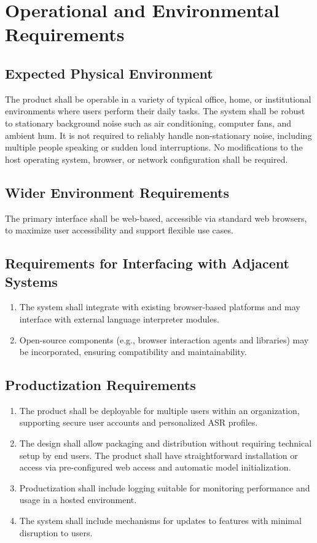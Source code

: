 \documentclass[12pt]{article}
\begin{document}
\section{Operational and Environmental Requirements}
\subsection{Expected Physical Environment}
The product shall be operable in a variety of typical office, home, or institutional environments where users perform their daily tasks. The system shall be robust to stationary background noise such as air conditioning, computer fans, and ambient hum. It is not required to reliably handle non-stationary noise, including multiple people speaking or sudden loud interruptions. No modifications to the host operating system, browser, or network configuration shall be required.
\subsection{Wider Environment Requirements}
The primary interface shall be web-based, accessible via standard web browsers, to maximize user accessibility and support flexible use cases.
\subsection{Requirements for Interfacing with Adjacent Systems}
\begin{enumerate}
    \item The system shall integrate with existing browser-based platforms and may interface with external language interpreter modules.
    \item Open-source components (e.g., browser interaction agents and libraries) may be incorporated, ensuring compatibility and maintainability.
\end{enumerate}

\subsection{Productization Requirements}
\begin{enumerate}
    \item The product shall be deployable for multiple users within an organization, supporting secure user accounts and personalized ASR profiles.
    \item The design shall allow packaging and distribution without requiring technical setup by end users. The product shall have straightforward installation or access via pre-configured web access and automatic model initialization.
    \item Productization shall include logging suitable for monitoring performance and usage in a hosted environment.
    \item The system shall include mechanisms for updates to features with minimal disruption to users.
\end{enumerate}
\end{document}
